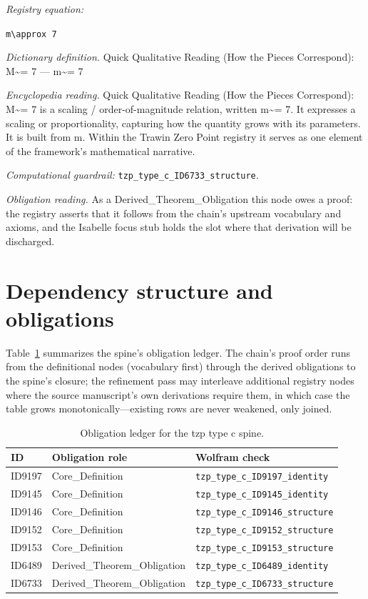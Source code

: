 \documentclass[11pt]{article}
\theoremstyle{remark}
\begin{document}
\noindent\textit{Registry equation:}\par
{\small\texttt{m\textbackslash{}approx 7}}\par\medskip
\noindent\textit{Dictionary definition.} Quick Qualitative Reading (How the Pieces Correspond): M\textasciitilde{}= 7 --- m\textasciitilde{}= 7\par\medskip
\noindent\textit{Encyclopedia reading.} Quick Qualitative Reading (How the Pieces Correspond): M\textasciitilde{}= 7 is a scaling / order-of-magnitude relation, written m\textasciitilde{}= 7. It expresses a scaling or proportionality, capturing how the quantity grows with its parameters. It is built from m. Within the Trawin Zero Point registry it serves as one element of the framework's mathematical narrative.
\par\medskip\noindent\textit{Computational guardrail:} \texttt{tzp\_type\_c\_ID6733\_structure}.
\par\medskip\noindent\textit{Obligation reading.} As a Derived\_Theorem\_Obligation this node owes a proof: the registry asserts that it follows from the chain's upstream vocabulary and axioms, and the Isabelle focus stub holds the slot where that derivation will be discharged.

\section{Dependency structure and obligations}
\label{sec:dep}

Table~\ref{tab:obligations} summarizes the spine's obligation ledger. The chain's proof order runs from the definitional nodes (vocabulary first) through the derived obligations to the spine's closure; the refinement pass may interleave additional registry nodes where the source manuscript's own derivations require them, in which case the table grows monotonically---existing rows are never weakened, only joined.

\begin{table}[ht]
\centering
\small
\caption{Obligation ledger for the tzp type c spine.}
\label{tab:obligations}
\begin{tabular}{llp{6.2cm}}
\toprule
ID & Obligation role & Wolfram check \\
\midrule
ID9197 & Core\_Definition & \texttt{tzp\_type\_c\_ID9197\_identity} \\
ID9145 & Core\_Definition & \texttt{tzp\_type\_c\_ID9145\_identity} \\
ID9146 & Core\_Definition & \texttt{tzp\_type\_c\_ID9146\_structure} \\
ID9152 & Core\_Definition & \texttt{tzp\_type\_c\_ID9152\_structure} \\
ID9153 & Core\_Definition & \texttt{tzp\_type\_c\_ID9153\_structure} \\
ID6489 & Derived\_Theorem\_Obligation & \texttt{tzp\_type\_c\_ID6489\_identity} \\
ID6733 & Derived\_Theorem\_Obligation & \texttt{tzp\_type\_c\_ID6733\_structure} \\
\bottomrule
\end{tabular}
\end{table}
\end{document}
